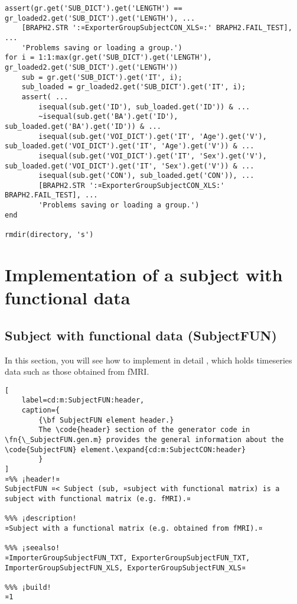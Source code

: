 \documentclass{tufte-handout}
\begin{document}
\begin{lstlisting}
assert(gr.get('SUB_DICT').get('LENGTH') == gr_loaded2.get('SUB_DICT').get('LENGTH'), ...
	[BRAPH2.STR ':¤ExporterGroupSubjectCON_XLS¤:' BRAPH2.FAIL_TEST], ...
    'Problems saving or loading a group.')
for i = 1:1:max(gr.get('SUB_DICT').get('LENGTH'), gr_loaded2.get('SUB_DICT').get('LENGTH'))
    sub = gr.get('SUB_DICT').get('IT', i);
    sub_loaded = gr_loaded2.get('SUB_DICT').get('IT', i);    
    assert( ...
        isequal(sub.get('ID'), sub_loaded.get('ID')) & ...
        ~isequal(sub.get('BA').get('ID'), sub_loaded.get('BA').get('ID')) & ...
        isequal(sub.get('VOI_DICT').get('IT', 'Age').get('V'), sub_loaded.get('VOI_DICT').get('IT', 'Age').get('V')) & ... 
        isequal(sub.get('VOI_DICT').get('IT', 'Sex').get('V'), sub_loaded.get('VOI_DICT').get('IT', 'Sex').get('V')) & ...
        isequal(sub.get('CON'), sub_loaded.get('CON')), ...
        [BRAPH2.STR ':¤ExporterGroupSubjectCON_XLS:' BRAPH2.FAIL_TEST], ...
        'Problems saving or loading a group.')    
end

rmdir(directory, 's')
\end{lstlisting}

\clearpage

\section{Implementation of a subject with functional data}

\subsection{Subject with functional data (SubjectFUN)}

In this section, you will see how to implement in detail , which holds timeseries data such as those obtained from fMRI.

\begin{lstlisting}[
	label=cd:m:SubjectFUN:header,
	caption={
		{\bf SubjectFUN element header.}
		The \code{header} section of the generator code in \fn{\_SubjectFUN.gen.m} provides the general information about the \code{SubjectFUN} element.\expand{cd:m:SubjectCON:header}
		}
]
¤%% ¡header!¤
SubjectFUN ¤< Subject (sub, ¤subject with functional matrix) is a subject with functional matrix (e.g. fMRI).¤

%%% ¡description!
¤Subject with a functional matrix (e.g. obtained from fMRI).¤

%%% ¡seealso!
¤ImporterGroupSubjectFUN_TXT, ExporterGroupSubjectFUN_TXT, ImporterGroupSubjectFUN_XLS, ExporterGroupSubjectFUN_XLS¤

%%% ¡build!
¤1
\end{lstlisting}
\end{document}
